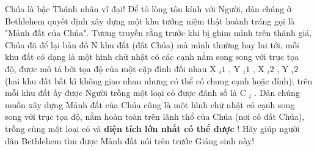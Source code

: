 Chúa là bậc Thánh nhân vĩ đại! Để tỏ lòng tôn kính với Người, dân chúng ở Bethlehem quyết định xây dựng một khu tưởng niệm thật hoành tráng gọi là "Mảnh đất của Chúa". Tương truyền rằng trước khi bị ghim mình trên thánh giá, Chúa đã để lại bản đồ N khu đất (đất Chúa) mà mình thường hay lui tới, mỗi khu đất có dạng là một hình chữ nhật có các cạnh nằm song song với trục tọa độ, được mô tả bởi tọa độ của một cặp đỉnh đối nhau X $_ i1 $ , Y $_ i1 $ , X $_ i2 $ , Y $_ i2 $ (hai khu đất bất kì không giao nhau nhưng có thể có chung cạnh hoặc đỉnh); trên mỗi khu đất ấy được Người trồng một loại cỏ được đánh số là C $_ i $ . Dân chúng muốn xây dựng Mảnh đất của Chúa cũng là một hình chữ nhật có cạnh song song với trục tọa độ, nằm hoàn toàn trên lãnh thổ của Chúa (nơi có đất Chúa), trồng cùng một loại cỏ và \textbf{ diện tích lớn nhất có thể được } ! Hãy giúp người dân Bethlehem tìm được Mảnh đất nói trên trước Giáng sinh này!